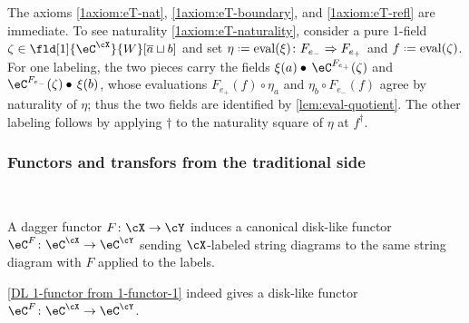 \documentclass[12pt,reqno]{amsart}
\newcommand{\eval}{\mathrm{eval}}
\newcommand{\blt}{\bullet}
\newcommand{\fcj}[1]{\overline{#1}}
\renewcommand{\amalg}{\sqcup}
\DeclareRobustCommand{\coloneq}{\mathrel{\vcenter{\baselineskip0.5ex\lineskiplimit0pt\hbox{\scriptsize{\upshape.}}\hbox{\scriptsize{\upshape.}}}}=}
\begin{document}
\begin{construction}
\begin{itemize}
\[          \]
\end{itemize}
  The axioms \ref{1axiom:eT-nat}, \ref{1axiom:eT-boundary}, and \ref{1axiom:eT-refl} are immediate. To see naturality \ref{1axiom:eT-naturality}, consider a pure 1-field $\zeta\in\fld[1]{\eC^\cX}{W}[\fcj{a}\amalg b]$ and set $\eta\coloneq\eval(\xi)\colon F_{e_-}\Rightarrow F_{e_+}$ and $f\coloneq\eval(\zeta)$. For one labeling, the two pieces carry the fields $\xi(a)\blt\,\eC^{F_{e_+}}(\zeta)$ and $\eC^{F_{e_-}}(\zeta)\blt\,\xi(b)$, whose evaluations $F_{e_+}(f)\circ\eta_a$ and $\eta_b\circ F_{e_-}(f)$ agree by naturality of $\eta$; thus the two fields are identified by \cref{lem:eval-quotient}. The other labeling follows by applying $\dag$ to the naturality square of $\eta$ at $f^\dag$.
\end{construction}

\subsubsection{Functors and transfors from the traditional side}

\

\begin{construction}[Disk-like functors from functors, \texorpdfstring{$n=1$}{n is 1}]
  \label{DL 1-functor from 1-functor-1}
  A dagger functor $F\colon \cX\to\cY$ induces a canonical disk-like functor $\eC^F\colon\eC^\cX\to\eC^\cY$ sending $\cX$-labeled string diagrams to the same string diagram with $F$ applied to the labels.
\end{construction}

\begin{lemma}
  \label{DL 1-functor from 1-functor-1-pf}
  \cref{DL 1-functor from 1-functor-1} indeed gives a disk-like functor $\eC^F\colon\eC^\cX\to\eC^\cY$.
\end{lemma}
\end{document}
